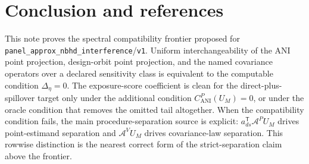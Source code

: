 \documentclass[11pt]{article}
\newcommand{\transpose}{\mathsf{T}}
\theoremstyle{definition}
\theoremstyle{plain}
\theoremstyle{remark}
\begin{document}
\section{Conclusion and references}
This note proves the spectral compatibility frontier proposed for
\texttt{panel\_approx\_nbhd\_interference}/\texttt{v1}.  Uniform
interchangeability of the ANI point projection, design-orbit point
projection, and the named covariance operators over a declared sensitivity
class is equivalent to the computable condition \(\Delta_\eta=0\).  The
exposure-score coefficient is clean for the direct-plus-spillover target only
under the additional condition \(C^P_{\mathrm{ANI}}(U_M)=0\), or under the
oracle condition that removes the omitted tail altogether.  When the
compatibility condition fails, the main procedure-separation source is
explicit: \(a_{ds}^{\transpose}\mathcal A^P U_M\) drives point-estimand
separation and \(\mathcal A^V U_M\) drives covariance-law separation.  This
rowwise distinction is the nearest correct form of the strict-separation
claim above the frontier.
\end{document}
